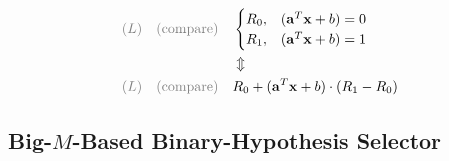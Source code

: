 \documentclass[onecolumn]{ctexart}
\begin{document}
\begin{equation}
    \begin{aligned}
        \text{\color{gray} ($L$)} \quad
        \text{\color{gray} (compare)} \quad
        &
        \begin{cases}
            R_0,  & (\mathbf{a}^T \mathbf{x} + b) = 0  \\
            R_1,  & (\mathbf{a}^T \mathbf{x} + b) = 1  \\
        \end{cases}
        \\
        & \Updownarrow
        \\
        \text{\color{gray} ($L$)} \quad
        \text{\color{gray} (compare)} \quad
        &
        R_0 + (\mathbf{a}^T \mathbf{x} + b) \cdot (R_1 - R_0)
    \end{aligned}
\end{equation}






\vspace{30pt}
\subsection{Big-$M$-Based Binary-Hypothesis Selector}
\end{document}
